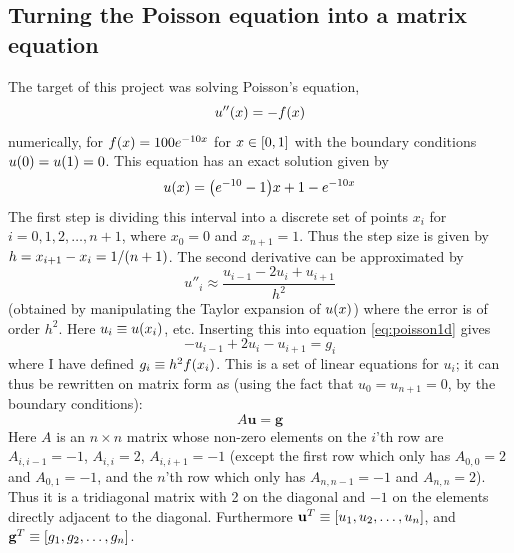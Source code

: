 \documentclass[a4paper,english]{article}
\renewcommand\vec{\mathbf}
\let\originalleft\left
\let\originalright\right
\renewcommand{\left}{\mathopen{}\mathclose\bgroup\originalleft}
\renewcommand{\right}{\aftergroup\egroup\originalright}
\begin{document}
\subsection{Turning the Poisson equation into a matrix equation}
The target of this project was solving Poisson's equation,
\begin{equation}
  u''\left(x\right) = -f\left(x\right)
  \label{eq:poisson1d}
\end{equation}
numerically, for $f\left(x\right) = 100e^{-10x}$ for $x\in \left[0,1\right]$ with the boundary conditions $u\left(0\right) = u\left(1\right) = 0$. This equation has an exact solution given by \cite{assignment}
\begin{equation}
  u\left(x\right) = \left(e^{-10}-1\right)x+1-e^{-10x}
  \label{eq:u_exact}
\end{equation}
The first step is dividing this interval into a discrete set of points $x_i$ for $i = 0,1,2,\dots,n+1$, where $x_0 = 0$ and $x_{n+1} = 1$. Thus the step size is given by $h = x_{i+1}-x_i = 1/\left(n+1\right)$. The second derivative can be approximated by \cite{lecturenotes}
\begin{equation}
  u''_i \approx \frac{u_{i-1}-2u_i+u_{i+1}}{h^2}
  \label{eq:2ndderivative}
\end{equation}
(obtained by manipulating the Taylor expansion of $u\left(x\right)$) where the error is of order $h^2$. Here $u_i \equiv u\left(x_i\right)$, etc. Inserting this into equation \ref{eq:poisson1d} gives
\begin{equation*}
  -u_{i-1}+2u_i-u_{i+1} = g_i
\end{equation*}
where I have defined $g_i \equiv h^2f\left(x_i\right)$. This is a set of linear equations for $u_i$; it can thus be rewritten on matrix form as (using the fact that $u_0 = u_{n+1} = 0$, by the boundary conditions):
\begin{equation}
  A \vec{u} = \vec{g}
  \label{eq:matrix_eq}
\end{equation}
Here $A$ is an $n\times n$ matrix whose non-zero elements on the $i$'th row are $A_{i,i-1} = -1$, $A_{i,i} =2$, $A_{i,i+1} = -1$ (except the first row which only has $A_{0,0} = 2$ and $A_{0,1} = -1$, and the $n$'th row which only has $A_{n,n-1} = -1$ and $A_{n,n} = 2$). Thus it is a tridiagonal matrix with 2 on the diagonal and $-1$ on the elements directly adjacent to the diagonal. Furthermore $\vec{u}^T \equiv \left[u_1,u_2,\dots,u_n\right]$, and $\vec{g}^T \equiv \left[g_1,g_2,\dots,g_n\right]$.
\end{document}
